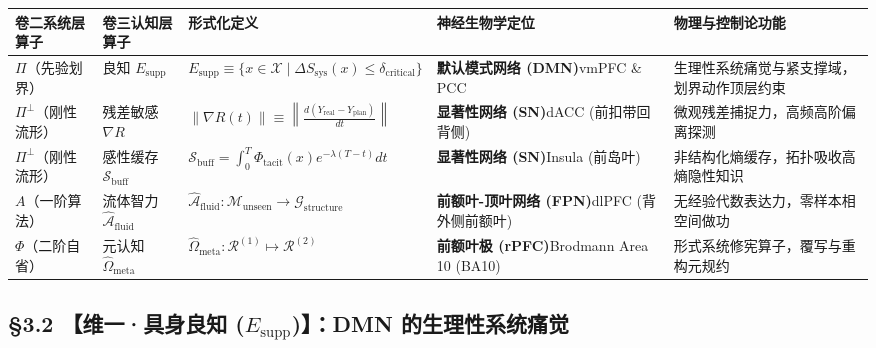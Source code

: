 \documentclass[11pt,a4paper,oneside]{ctexart}
\begin{document}
\begin{table}[htbp]
\centering
\small
\begin{tabular}{p{2.2cm}p{2.5cm}p{2.5cm}p{2.3cm}p{5.0cm}}
\toprule
卷二系统层算子 & 卷三认知层算子 & 形式化定义 & 神经生物学定位 & 物理与控制论功能 \\
\midrule
\textit{}$\Pi$（先验划界）\textit{} & \textit{}良知 $E_{\text{supp}}$\textit{} & $E_{\text{supp}} \equiv \{x \in \mathcal{X} \mid \Delta S_{\text{sys}}(x) \le \delta_{\text{critical}}\}$ & \textbf{默认模式网络 (DMN)}\newline vmPFC \& PCC & 生理性系统痛觉与紧支撑域，划界动作顶层约束 \\
\textit{}$\Pi^\perp$（刚性流形）\textit{} & \textit{}残差敏感 $\nabla R$\textit{} & $\|\nabla R(t)\| \equiv \left\| \frac{d (Y_{\text{real}} - Y_{\text{plan}})}{dt} \right\|$ & \textbf{显著性网络 (SN)}\newline dACC (前扣带回背侧) & 微观残差捕捉力，高频高阶偏离探测 \\
\textit{}$\Pi^\perp$（刚性流形）\textit{} & \textit{}感性缓存 $\mathcal{S}_{\text{buff}}$\textit{} & $\mathcal{S}_{\text{buff}} = \int_0^T \Phi_{\text{tacit}}(x) e^{-\lambda (T-t)} dt$ & \textbf{显著性网络 (SN)}\newline Insula (前岛叶) & 非结构化熵缓存，拓扑吸收高熵隐性知识 \\
\textit{}$A$（一阶算法）\textit{} & \textit{}流体智力 $\hat{\mathcal{A}}_{\text{fluid}}$\textit{} & $\hat{\mathcal{A}}_{\text{fluid}}: \mathcal{M}_{\text{unseen}} \to \mathcal{G}_{\text{structure}}$ & \textbf{前额叶-顶叶网络 (FPN)}\newline dlPFC (背外侧前额叶) & 无经验代数表达力，零样本相空间做功 \\
\textit{}$\Phi$（二阶自省）\textit{} & \textit{}元认知 $\hat{\Omega}_{\text{meta}}$\textit{} & $\hat{\Omega}_{\text{meta}}: \mathcal{R}^{(1)} \mapsto \mathcal{R}^{(2)}$ & \textbf{前额叶极 (rPFC)}\newline Brodmann Area 10 (BA10) & 形式系统修宪算子，覆写与重构元规约 \\
\bottomrule
\end{tabular}
\end{table}

\subsection{§3.2 【维一·具身良知 (\texorpdfstring{$E_{\text{supp}}$}{E\_supp})】：DMN 的生理性系统痛觉}
\end{document}
